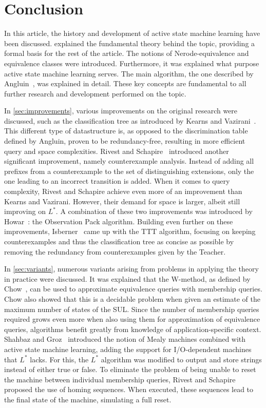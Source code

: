 \documentclass[multi,crop=false,class=article]{standalone}
\begin{document}
\section*{Conclusion}
\label{sec:conclusion}
In this article, the history and development of active state machine learning
have been discussed.  explained the fundamental theory behind the
topic, providing a formal basis for the rest of the article. The notions of
Nerode-equivalence and equivalence classes were introduced. Furthermore, it was
explained what purpose active state machine learning serves. The main algorithm,
the one described by Angluin~\cite{Angluin1987}, was explained in detail. These
key concepts are fundamental to all further research and development performed
on the topic.

In \cref{sec:improvements}, various improvements on the original research were discussed,
such as the classification tree as introduced by Kearns and Vazirani~\cite{Kearns1994}.
This different type of datastructure is, as opposed to the discrimination table
defined by Angluin, proven to be redundancy-free, resulting in more efficient
query and space complexities. Rivest and Schapire~\cite{Rivest1993} introduced
another significant improvement, namely counterexample analysis. Instead of
adding all prefixes from a counterexample to the set of distinguishing
extensions, only the one leading to an incorrect transition is added. When it
comes to query complexity, Rivest and Schapire achieve even more of an improvement
than Kearns and Vazirani. However, their demand for space is larger, albeit
still improving on $L^*$. A combination of these two improvements was introduced
by Howar~\cite{Howar2012a,Isberner2015a}: the Observation Pack algorithm.
Building even further on these improvements, Isberner~\cite{Isberner2014b} came
up with the TTT algorithm, focusing on keeping counterexamples and thus the
classification tree as concise as possible by removing the redundancy from
counterexamples given by the Teacher.

In \cref{sec:variants}, numerous variants arising from problems in applying
the theory in practice were discussed. It was explained that the W-method,
as defined by Chow~\cite{deRuiter2015,Chow1978}, can be used to approximate equivalence
queries with membership queries. Chow also showed that this is a decidable problem
when given an estimate of the maximum number of states of the SUL.
Since the number of membership queries required grows even more when also using
them for approximation of equivalence queries, algorithms benefit greatly from
knowledge of application-specific context.
Shahbaz and Groz~\cite{Shahbaz2009}
introduced the notion of Mealy machines combined with active state machine
learning, adding the support for I/O-dependent machines that $L^*$ lacks. For
this, the $L^*$ algorithm was modified to output and store strings instead of
either true or false. To eliminate the problem of being unable to reset the
machine between individual membership queries, Rivest and Schapire~\cite{Rivest1993}
proposed the use of homing sequences. When executed, these sequences lead to the
final state of the machine, simulating a full reset.
\end{document}
